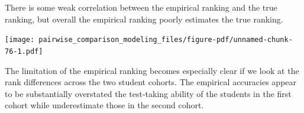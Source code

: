 \documentclass[
  letterpaper,
  DIV=11,
  numbers=noendperiod]{scrartcl}
\newenvironment{Shaded}{\begin{snugshade}}{\end{snugshade}}
\newcommand{\AttributeTok}[1]{\textcolor[rgb]{0.40,0.45,0.13}{#1}}
\newcommand{\DecValTok}[1]{\textcolor[rgb]{0.68,0.00,0.00}{#1}}
\newcommand{\FunctionTok}[1]{\textcolor[rgb]{0.28,0.35,0.67}{#1}}
\newcommand{\NormalTok}[1]{\textcolor[rgb]{0.00,0.23,0.31}{#1}}
\newcommand{\SpecialCharTok}[1]{\textcolor[rgb]{0.37,0.37,0.37}{#1}}
\newcommand{\StringTok}[1]{\textcolor[rgb]{0.13,0.47,0.30}{#1}}
\begin{document}
There is some weak correlation between the empirical ranking and the
true ranking, but overall the empirical ranking poorly estimates the
true ranking.

\begin{Shaded}
\end{Shaded}

\texttt{[image: pairwise\_comparison\_modeling\_files/figure-pdf/unnamed-chunk-76-1.pdf]}

The limitation of the empirical ranking becomes especially clear if we
look at the rank differences across the two student cohorts. The
empirical accuracies appear to be substantially overstated the
test-taking ability of the students in the first cohort while
underestimate those in the second cohort.
\end{document}
